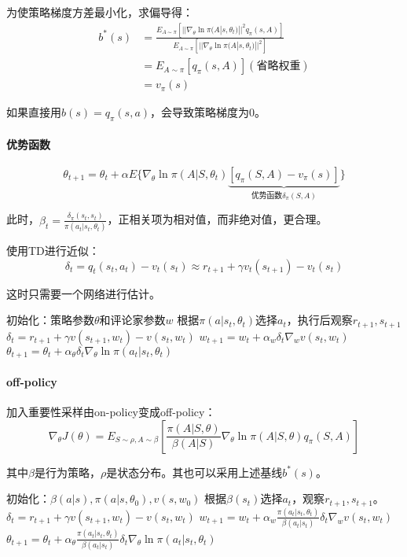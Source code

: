 \documentclass[
12pt, %
a4paper, 
oneside, %
headinclude,footinclude, %
]{scrartcl}
\begin{document}
为使策略梯度方差最小化，求偏导得：
\begin{align*}
b^*(s) &= \frac{E_{A\sim\pi}[||\nabla_\theta\ln\pi(A|s,\theta_t)||^2 q_\pi(s,A)]}{E_{A\sim\pi}[||\nabla_\theta\ln\pi(A|s,\theta_t)||^2]} \\
&= E_{A\sim\pi}[q_\pi(s,A)] (\text{省略权重}) \\
&= v_{\pi}(s)
\end{align*}

如果直接用$ b(s) = q_{\pi}(s, a) $，会导致策略梯度为$ 0 $。
\paragraph{优势函数}
$$ \theta_{t + 1} = \theta_t + \alpha E\{\nabla_\theta \ln \pi(A|S, \theta_t) \underbrace{[q_\pi(S, A) - v_{\pi}(s)]}_{\text{优势函数}\delta_{\pi}(S, A)}\} $$

此时，$ \beta_t = \frac{\delta_{\pi}(s_t, s_t)}{\pi(a_t|s_t, \theta_t)} $，正相关项为相对值，而非绝对值，更合理。

使用TD进行近似：
$$ \delta_t = q_t(s_t, a_t) - v_t(s_t) \approx r_{t + 1} + \gamma v_t(s_{t + 1}) - v_t(s_t) $$

这时只需要一个网络进行估计。
\begin{myalgorithm}[A2C]
\State 初始化：策略参数$ \theta $和评论家参数$ w $
\State 根据$ \pi(a|s_t, \theta_t) $选择$ a_t $，执行后观察$ r_{t + 1}, s_{t + 1} $
\State $ \delta_t = r_{t + 1} + \gamma v(s_{t + 1}, w_t) - v(s_t, w_t) $ 
\State $ w_{t + 1} = w_t + \alpha_w \delta_t \nabla_w v(s_t, w_t) $ 
\State $ \theta_{t + 1} = \theta_t + \alpha_\theta \delta_t \nabla_\theta \ln \pi(a_t|s_t, \theta_t) $ 
\EndFor
\EndFor
\end{myalgorithm}
\paragraph{off-policy}
加入重要性采样由on-policy变成off-policy：
$$ \nabla_\theta J(\theta) = E_{S \sim \rho, A \sim \beta}[\frac{\pi(A|S,\theta)}{\beta(A|S)}\nabla_\theta\ln\pi(A|S,\theta)q_\pi(S,A)] $$

其中$ \beta $是行为策略，$ \rho $是状态分布。其也可以采用上述基线$ b^*(s) $。
\begin{myalgorithm}
\State 初始化：$ \beta(a|s), \pi(a|s,\theta_0), v(s,w_0) $
\State 根据$ \beta(s_t) $选择$ a_t $，观察$ r_{t + 1}, s_{t + 1} $。
\State $ \delta_t = r_{t + 1} + \gamma v(s_{t + 1}, w_t) - v(s_t, w_t) $ 
\State $ w_{t + 1} = w_t + \alpha_w \frac{\pi(a_t|s_t,\theta_t)}{\beta(a_t|s_t)} \delta_t \nabla_w v(s_t, w_t) $ 
\State $ \theta_{t + 1} = \theta_t + \alpha_\theta \frac{\pi(a_t|s_t,\theta_t)}{\beta(a_t|s_t)} \delta_t \nabla_\theta \ln \pi(a_t|s_t, \theta_t) $ 
\EndFor
\EndFor
\end{myalgorithm}
\end{document}
